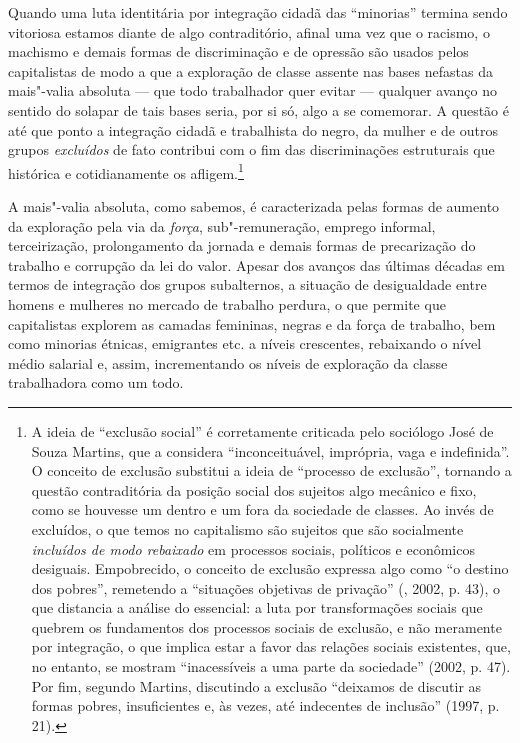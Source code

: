 Quando uma luta identitária por integração cidadã das ``minorias''
termina sendo vitoriosa estamos diante de algo contraditório, afinal uma
vez que o racismo, o machismo e demais formas de discriminação e de
opressão são usados pelos capitalistas de modo a que a exploração de
classe assente nas bases nefastas da mais"-valia absoluta --- que todo
trabalhador quer evitar --- qualquer avanço no sentido do solapar de tais
bases seria, por si só, algo a se comemorar. A questão é até que ponto a
integração cidadã e trabalhista do negro, da mulher e de outros grupos
\emph{excluídos} de fato contribui com o fim das discriminações
estruturais que histórica e cotidianamente os afligem.\footnote{A ideia
  de ``exclusão social'' é corretamente criticada pelo sociólogo José de
  Souza Martins, que a considera ``inconceituável, imprópria, vaga e
  indefinida''. O conceito de exclusão substitui a ideia de ``processo
  de exclusão'', tornando a questão contraditória da posição social dos
  sujeitos algo mecânico e fixo, como se houvesse um dentro e um fora da
  sociedade de classes. Ao invés de excluídos, o que temos no
  capitalismo são sujeitos que são socialmente \emph{incluídos de modo
  rebaixado} em processos sociais, políticos e econômicos desiguais.
  Empobrecido, o conceito de exclusão expressa algo como ``o destino dos
  pobres'', remetendo a ``situações objetivas de privação'' (,
  2002, p. 43), o que distancia a análise do essencial: a luta por
  transformações sociais que quebrem os fundamentos dos processos
  sociais de exclusão, e não meramente por integração, o que implica
  estar a favor das relações sociais existentes, que, no entanto, se
  mostram ``inacessíveis a uma parte da sociedade'' (2002, p. 47). Por
  fim, segundo Martins, discutindo a exclusão ``deixamos de discutir as
  formas pobres, insuficientes e, às vezes, até indecentes de inclusão''
  (1997, p. 21).}

A mais"-valia absoluta, como sabemos, é caracterizada pelas formas de
aumento da exploração pela via da \emph{força}, sub"-remuneração, emprego
informal, terceirização, prolongamento da jornada e demais formas de
precarização do trabalho e corrupção da lei do valor. Apesar dos avanços
das últimas décadas em termos de integração dos grupos subalternos, a
situação de desigualdade entre homens e mulheres no mercado de trabalho
perdura, o que permite que capitalistas explorem as camadas femininas,
negras e  da força de trabalho, bem como minorias étnicas,
emigrantes etc. a níveis crescentes, rebaixando o nível médio salarial
e, assim, incrementando os níveis de exploração da classe trabalhadora
como um todo.

